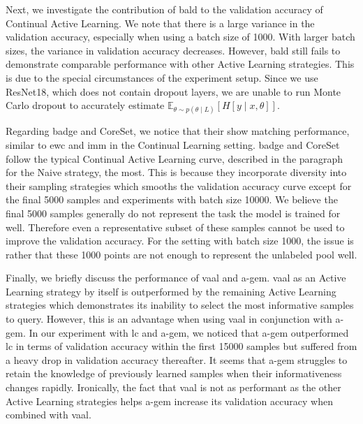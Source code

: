 Next, we investigate the contribution of \gls{bald} to the validation accuracy of Continual Active Learning. We note that there is a large variance in the validation
accuracy, especially when using a batch size of 1000. With larger batch sizes, the variance in validation accuracy decreases. However, \gls{bald} still fails to demonstrate
comparable performance with other Active Learning strategies. This is due to the special circumstances of the experiment setup. Since we use ResNet18, which does not contain
dropout layers, we are unable to run Monte Carlo dropout to accurately estimate $\mathbb{E}_{\theta \sim p(\theta \mid L)} [H[y \mid x, \theta]]$. \par
Regarding \gls{badge} and CoreSet, we notice that their show matching performance, similar to \gls{ewc} and \gls{imm} in the Continual Learning setting. \gls{badge} and CoreSet follow
the typical Continual Active Learning curve, described in the paragraph for the Naive strategy, the most. This is because they incorporate diversity into their
sampling strategies which smooths the validation accuracy curve except for the final 5000 samples and experiments with batch size 10000. We believe the final 5000 samples
generally do not represent the task the model is trained for well. Therefore even a representative subset of these samples cannot be used to improve the validation
accuracy. For the setting with batch size 1000, the issue is rather that these 1000 points are not enough to represent the unlabeled pool well. \par
Finally, we briefly discuss the performance of \gls{vaal} and \gls{a-gem}. \gls{vaal} as an Active Learning strategy by itself is outperformed by the remaining Active
Learning strategies which demonstrates its inability to select the most informative samples to query. However, this is an advantage when using \gls{vaal} in conjunction
with \gls{a-gem}. In our experiment with \gls{lc} and \gls{a-gem}, we noticed that \gls{a-gem} outperformed \gls{lc} in terms of validation accuracy within the first 15000
samples but suffered from a heavy drop in validation accuracy thereafter. It seems that \gls{a-gem} struggles to retain the knowledge of previously learned samples when
their informativeness changes rapidly. Ironically, the fact that \gls{vaal} is not as performant as the other Active Learning strategies helps \gls{a-gem} increase its
validation accuracy when combined with \gls{vaal}. \par

